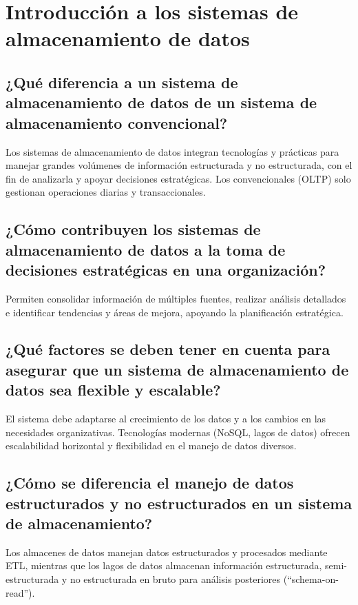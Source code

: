 \documentclass{../../../miPlantilla}
\begin{document}
\maketitle

\section{Introducción a los sistemas de almacenamiento de datos}

\subsection{¿Qué diferencia a un sistema de almacenamiento de datos de un sistema de almacenamiento convencional?}

Los sistemas de almacenamiento de datos integran tecnologías y prácticas para manejar grandes volúmenes de información estructurada y
no estructurada, con el fin de analizarla y apoyar decisiones estratégicas. Los convencionales (OLTP) solo gestionan operaciones diarias
y transaccionales.

\subsection{¿Cómo contribuyen los sistemas de almacenamiento de datos a la toma de decisiones estratégicas en una organización?}

Permiten consolidar información de múltiples fuentes, realizar análisis detallados e identificar tendencias y áreas de mejora, apoyando
la planificación estratégica.

\subsection{¿Qué factores se deben tener en cuenta para asegurar que un sistema de almacenamiento de datos sea flexible y escalable?}

El sistema debe adaptarse al crecimiento de los datos y a los cambios en las necesidades organizativas. Tecnologías modernas (NoSQL, lagos
de datos) ofrecen escalabilidad horizontal y flexibilidad en el manejo de datos diversos.

\subsection{¿Cómo se diferencia el manejo de datos estructurados y no estructurados en un sistema de almacenamiento?}

Los almacenes de datos manejan datos estructurados y procesados mediante ETL, mientras que los lagos de datos almacenan información
estructurada, semi-estructurada y no estructurada en bruto para análisis posteriores (“schema-on-read”).
\end{document}
